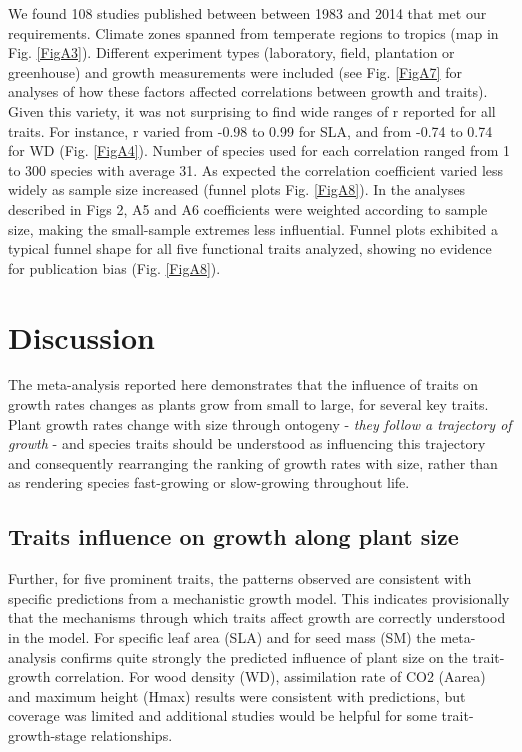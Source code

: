 \documentclass[a4paper]{article}\usepackage[]{graphicx}\usepackage[]{color}
\begin{document}
We found 108 studies published between between 1983 and 2014 that met our requirements. Climate zones spanned from temperate regions to  tropics (map in Fig. \ref{FigA3}). Different experiment types (laboratory, field, plantation or greenhouse) and growth measurements were included (see Fig. \ref{FigA7} for analyses of how these factors affected  correlations between growth and traits). Given this variety, it was not surprising to find wide ranges of r reported for all traits. For instance,  r varied from -0.98 to 0.99 for SLA, and from -0.74 to 0.74 for WD (Fig. \ref{FigA4}). Number of species used for each correlation ranged from 1 to 300 species with average  31. As expected the correlation coefficient varied less widely as sample size increased (funnel plots Fig. \ref{FigA8}). In the analyses described in Figs 2, A5 and A6 coefficients were weighted according to sample size, making the small-sample extremes less influential. Funnel plots exhibited a typical funnel shape for all five functional traits analyzed, showing no evidence for publication bias (Fig. \ref{FigA8}).


\section*{Discussion}\label{discussion}

The meta-analysis reported here demonstrates that the influence of traits on growth rates changes as plants grow from small to large, for several key traits. Plant growth rates change with size through ontogeny  \citep{Condit:1993hd, Clark:1999ed, Herault:2011dd} - \textit{they follow a trajectory of growth} - and species traits should be understood as influencing this trajectory and consequently rearranging the ranking of growth rates with size, rather than as rendering species fast-growing or slow-growing throughout life. 

\subsection*{Traits influence on growth along plant size}

Further, for five prominent traits, the patterns observed are consistent with specific predictions from a mechanistic growth model. This indicates provisionally that the mechanisms through which traits affect growth are correctly understood in the model. For specific leaf area (SLA) and for seed mass (SM) the meta-analysis confirms quite strongly the predicted influence of plant size on the trait-growth correlation. For wood density (WD), assimilation rate of CO2 (Aarea) and maximum height (Hmax) results were consistent with predictions, but coverage was limited and additional studies would be helpful for some trait-growth-stage relationships. 
\end{document}
